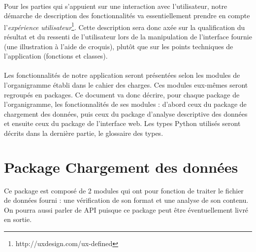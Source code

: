 		\paragraph{}Pour les parties qui s'appuient sur une interaction avec l'utilisateur, notre démarche de description des fonctionnalités va essentiellement prendre en compte l'\textit{expérience utilisateur}\footnote{http://uxdesign.com/ux-defined}. Cette description sera donc axée sur la qualification du résultat et du ressenti de l'utilisateur lors de la manipulation de l'interface fournie (une illustration à l'aide de croquis), plutôt que sur les points techniques de l'application (fonctions et classes).
		\paragraph{}Les fonctionnalités de notre application seront présentées selon les modules de l'organigramme établi dans le cahier des charges. Ces modules eux-mêmes seront regroupés en packages. Ce document va donc décrire, pour chaque package de l'organigramme, les fonctionnalités de ses modules : d'abord ceux du package de chargement des données, puis ceux du package d'analyse descriptive des données et ensuite ceux du package de l'interface web. Les types Python utilisés seront décrits dans la dernière partie, le glossaire des types.
		
	\section{Package Chargement des données}
	Ce package est composé de 2 modules qui ont pour fonction de traiter le fichier de données fourni : une vérification de son format et une analyse de son contenu. On pourra aussi parler de API puisque ce package peut être éventuellement livré en sortie. 
		
